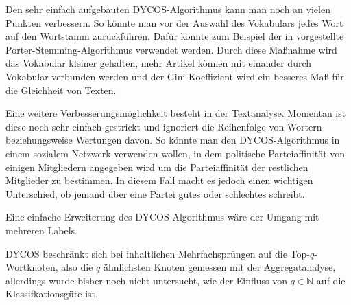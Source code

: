 Den sehr einfach aufgebauten DYCOS-Algorithmus kann man noch an
vielen Punkten verbessern. So könnte man vor der Auswahl des
Vokabulars jedes Wort auf den Wortstamm zurückführen.
Dafür könnte zum Beispiel der in \cite{porter} vorgestellte 
Porter-Stemming-Algorithmus verwendet werden. Durch diese Maßnahme wird das
Vokabular kleiner gehalten, mehr Artikel können mit einander
durch Vokabular verbunden werden und der Gini-Koeffizient wird ein
besseres Maß für die Gleichheit von Texten.

Eine weitere Verbesserungsmöglichkeit besteht in der Textanalyse.
Momentan ist diese noch sehr einfach gestrickt und ignoriert die
Reihenfolge von Wortern beziehungsweise Wertungen davon. So könnte
man den DYCOS-Algorithmus in einem sozialem Netzwerk verwenden wollen,
in dem politische Parteiaffinität von einigen Mitgliedern angegeben
wird um die Parteiaffinität der restlichen Mitglieder zu bestimmen.
In diesem Fall macht es jedoch einen wichtigen Unterschied, ob jemand
über eine Partei gutes oder schlechtes schreibt.

Eine einfache Erweiterung des DYCOS-Algorithmus wäre der Umgang mit 
mehreren Labels.

DYCOS beschränkt sich bei inhaltlichen Mehrfachsprüngen
auf die Top-$q$-Wortknoten, also die $q$ ähnlichsten Knoten
gemessen mit der Aggregatanalyse, allerdings wurde bisher noch nicht
untersucht, wie der Einfluss von $q \in \mathbb{N}$ auf die 
Klassifkationsgüte ist.
